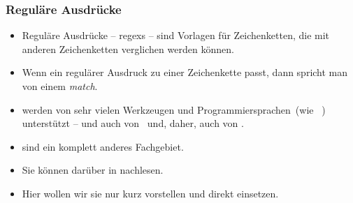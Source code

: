 \documentclass[aspectratio=169,mathserif,notheorems]{beamer}%
\begin{document}
%
\begin{frame}%
\frametitle{Reguläre Ausdrücke}%
\begin{itemize}%
\item Reguläre Ausdrücke -- \glspl{regex} -- sind Vorlagen für Zeichenketten, die mit anderen Zeichenketten verglichen werden können.%
\item<2-> Wenn ein regulärer Ausdruck zu einer Zeichenkette passt, dann spricht man von einem \emph{match}.%
\item<3->  werden von sehr vielen Werkzeugen und Programmiersprachen~(wie \DEzB~\python\cite{programmingWithPython}) unterstützt -- und auch von \sql\ und, daher, auch von \postgresql\cite{PGDG:PD:PRE}.%
\item<4->  sind ein komplett anderes Fachgebiet.
\item<5-> Sie können darüber in \cite{PGDG:PD:PRE} nachlesen.%
\item<6-> Hier wollen wir sie nur kurz vorstellen und direkt einsetzen.%
\end{itemize}%
\end{frame}%
%
\end{document}
